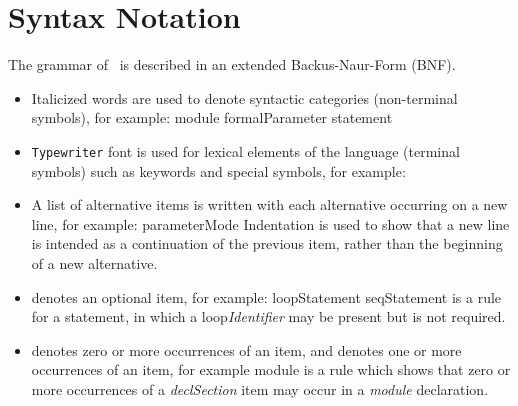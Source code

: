 \section{Syntax Notation}
The grammar of \candle\ is described in an extended Backus-Naur-Form (BNF).
\begin{itemize}
\item Italicized words are used to denote syntactic categories 
  (non-terminal symbols), for example:
  \bgrm
  \quad module
  \alt  formalParameter
  \alt  statement
  \egrm
\item {\tt Typewriter} font is used for lexical elements of the
  language (terminal symbols) such as keywords and special symbols,
  for example:
  \bgrm
  \quad {}
  \alt  \trm{>=}
  \alt  {}
  \egrm
\item A list of alternative items is written with each alternative
  occurring on a new line, for example:
  \bgrm
     parameterMode \Derive
     \alt {}
     \alt {}                
  \egrm
  Indentation is used to show that a new line is intended as a continuation of 
  the previous item, rather than the beginning of a new alternative.
\item \opt{$\cdot$} denotes an optional item, for example:
\bgrm                                    
loopStatement \Derive
     seqStatement  
\egrm
is a rule for a  statement, in which a loop{\it Identifier} may be
present but is not required.
\item \zom{$\cdot$} denotes zero or more occurrences of an item, and
  \oom{$\cdot$} denotes one or more occurrences of an item, for example
\bgrm
module \Derive
     
      
\egrm 
is a rule which shows that zero or more occurrences of a \emph{declSection}
item may occur in a \emph{module} declaration.
\end{itemize}

